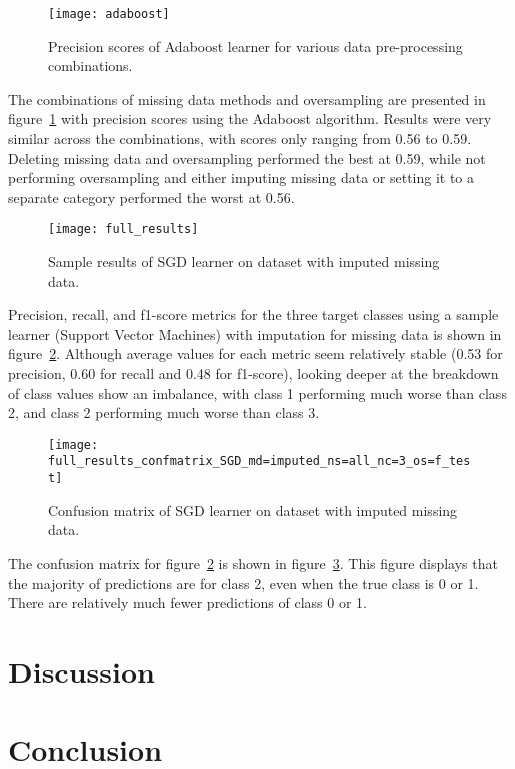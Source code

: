 \documentclass[conference]{IEEEtran}
\begin{document}
\begin{figure}[htpb]
	\centering
	\texttt{[image: adaboost]}
	\caption{Precision scores of Adaboost learner for various data pre-processing combinations.}
	\label{fig:adaboost}
\end{figure}

The combinations of missing data methods and oversampling are presented in figure~\ref{fig:adaboost} with precision scores using the Adaboost algorithm. Results were very similar across the combinations, with scores only ranging from 0.56 to 0.59. Deleting missing data and oversampling performed the best at 0.59, while not performing oversampling and either imputing missing data or setting it to a separate category performed the worst at 0.56.

\begin{figure}[htpb]
	\centering
	\texttt{[image: full\_results]}
	\caption{Sample results of SGD learner on dataset with imputed missing data.}
	\label{fig:full_results}
\end{figure}

Precision, recall, and f1-score metrics for the three target classes using a sample learner (Support Vector Machines) with imputation for missing data is shown in figure~\ref{fig:full_results}. Although average values for each metric seem relatively stable (0.53 for precision, 0.60 for recall and 0.48 for f1-score), looking deeper at the breakdown of class values show an imbalance, with class 1 performing much worse than class 2, and class 2 performing much worse than class 3.

\begin{figure}[htpb]
	\centering
	\texttt{[image: full\_results\_confmatrix\_SGD\_md=imputed\_ns=all\_nc=3\_os=f\_test]}
	\caption{Confusion matrix of SGD learner on dataset with imputed missing data.}
	\label{fig:full_results_cm}
\end{figure}

The confusion matrix for figure~\ref{fig:full_results} is shown in figure~\ref{fig:full_results_cm}. This figure displays that the majority of predictions are for class 2, even when the true class is 0 or 1. There are relatively much fewer predictions of class 0 or 1.

\section{Discussion}

\section{Conclusion}
\end{document}
